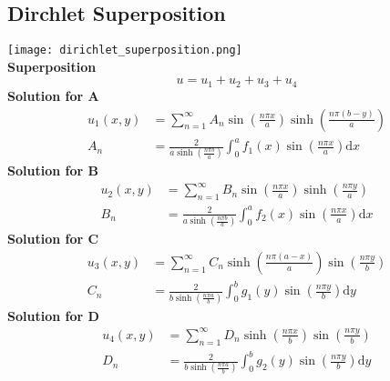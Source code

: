 \subsection{Dirchlet Superposition}\label{diri_superpos}
\texttt{[image: dirichlet\_superposition.png]}\\
\textbf{Superposition}
\begin{equation*}
    u = u_1+u_2+u_3+u_4
\end{equation*}
\textbf{Solution for A}
\begin{align*}
    u_1(x,y) & =\sum_{n=1}^\infty A_n\sin\left(\frac{n\pi x}a\right)\sinh\left(\frac{n\pi(b-y)}a\right)            \\
    A_n      & =\frac2{a\sinh\left(\frac{n\pi b}a\right)}\int_0^{a}f_1(x)\sin\left(\frac{n\pi x}a\right)\mathrm{d}x
\end{align*}
\textbf{Solution for B}
\begin{align*}
    u_2(x,y) & =\sum_{n=1}^\infty B_n\sin\left(\frac{n\pi x}a\right)\sinh\left(\frac{n\pi y}a\right)               \\
    B_n      & =\frac2{a\sinh\left(\frac{n\pi b}a\right)}\int_0^{a}f_2(x)\sin\left(\frac{n\pi x}a\right)\mathrm{d}x
\end{align*}
\textbf{Solution for C}
\begin{align*}
    u_3(x,y) & =\sum_{n=1}^\infty C_n\sinh\left(\frac{n\pi(a-x)}a\right)\sin\left(\frac{n\pi y}b\right)            \\
    C_n      & =\frac2{b\sinh\left(\frac{n\pi a}b\right)}\int_0^{b}g_1(y)\sin\left(\frac{n\pi y}b\right)\mathrm{d}y
\end{align*}
\textbf{Solution for D}
\begin{align*}
    u_4(x,y) & =\sum_{n=1}^\infty D_n\sinh\left(\frac{n\pi x}b\right)\sin\left(\frac{n\pi y}b\right)               \\
    D_n      & =\frac2{b\sinh\left(\frac{n\pi a}b\right)}\int_0^{b}g_2(y)\sin\left(\frac{n\pi y}b\right)\mathrm{d}y
\end{align*}